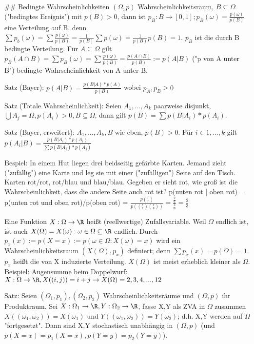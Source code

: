 \documentclass[10pt,landscape]{article}
\begin{document}
\begin{multicols}{3}
{{## Bedingte Wahrscheinlichkeiten
$(\Omega, p)$ Wahrscheinlichkeitsraum, $B\subseteq \Omega$ ("bedingtes Ereignis") mit $p(B)>0$, dann ist $p_B:B\rightarrow [0,1]; p_B(\omega)=\frac{p(\omega)}{p(B)}$ eine Verteilung auf B, denn $\sum p_b(\omega)=\sum \frac{p(\omega)}{p(B)}=\frac{1}{p(B)} \sum p(\omega)= \frac{1}{p(B)} p(B)= 1$.
$p_B$ ist die durch B bedingte Verteilung. Für $A\subseteq \Omega$ gilt $p_B(A\cap B)=\sum p_B(\omega)=\sum\frac{p(\omega)}{p(B)}= \frac{p(A\cap B)}{p(B)}:= p(A|B)$ ("p von A unter B") bedingte Wahrscheinlichkeit von A unter B.

Satz (Bayer): $p(A|B)=\frac{p(B|A)*p(A)}{p(B)}$ wobei $p_A, p_B \geq 0$

Satz (Totale Wahrscheinlichkeit): Seien $A_1, ...,A_k$ paarweise disjunkt, $\bigcup A_j=\Omega, p(A_i)>0, B\subseteq \Omega$, dann gilt $p(B)=\sum p(B|A_i)*p(A_i)$.

Satz (Bayer, erweitert): $A_1,...,A_k,B$ wie eben, $p(B)>0$. Für $i\in {1,...,k}$ gilt $p(A_i|B)=\frac{p(B|A_i)*p(A_i)}{\sum p(B|A_j)*p(A_j)}$

Bespiel: In einem Hut liegen drei beidseitig gefärbte Karten. Jemand zieht ("zufällig") eine Karte und leg sie mit einer ("zufälligen") Seite auf den Tisch. Karten rot/rot, rot/blau und blau/blau. Gegeben er sieht rot, wie groß ist die Wahrscheinlichkeit, dass die andere Seite auch rot ist?
p(unten rot | oben rot) = p(unten rot und oben rot)/p(oben rot) = $\frac{p\binom{r}{r}}{p(\binom{r}{r}\binom{r}{b})}=\frac{\frac{2}{6}}{\frac{3}{6}}=\frac{2}{3}$

Eine Funktion $X:\Omega \rightarrow \R$ heißt (reellwertige) Zufallsvariable. Weil $\Omega$ endlich ist, ist auch $X(\Omega)={X(\omega): \omega \in \Omega}\subseteq \R$ endlich. Durch $p_x(x):=p(X=x):=p({\omega \in \Omega: X(\omega)=x})$ wird ein Wahrscheinlichkeitsraum $(X(\Omega),p_x)$ definiert; denn $\sum p_x(x)=p(\Omega)=1$. $p_x$ heißt die von X induzierte Verteilung. $X(\Omega)$ ist meist erheblich kleiner als $\Omega$.
Beispiel: Augensumme beim Doppelwurf: $X:\Omega\rightarrow \R, X((i,j))=i+j \rightarrow X(\Omega)={2,3,4,...,12}$

Satz: Seien $(\Omega_1, p_1),(\Omega_2, p_2)$ Wahrscheinlichkeitsräume und $(\Omega, p)$ ihr Produktraum. Sei $X:\Omega_1\rightarrow\R,Y:\Omega_2\rightarrow \R$, fasse X,Y als ZVA in $\Omega$ zusammen $X((\omega_1,\omega_2))=X(\omega_1)$ und $Y((\omega_1,\omega_2))=Y(\omega_2)$; d.h. X,Y werden auf $\Omega$ "fortgesetzt". Dann sind X,Y stochastisch unabhängig in $(\Omega, p)$ (und $p(X=x)=p_1(X=x), p(Y=y)=p_2(Y=y)$).

}}
\end{multicols}
\end{document}
